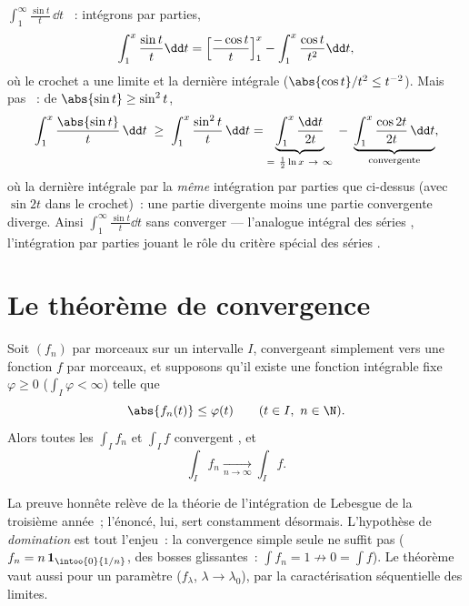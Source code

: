 \begin{example}\label{ex:b2:integration:sint}
$\displaystyle\int_1^{\infty} \frac{\sin t}{t}\,\dd t$ ~:
intégrons par parties,
\[
\int_1^x \frac{\sin t}{t}\dd t
= \Bigl[\frac{-\cos t}{t}\Bigr]_1^x - \int_1^x \frac{\cos
t}{t^2}\dd t ,
\]
où le crochet a une limite et la dernière intégrale 
 ($\abs{\cos t}/t^2 \leq t^{-2}$). Mais pas ~:
de $\abs{\sin t} \geq \sin^2 t$,
\[
\int_1^x \frac{\abs{\sin t}}{t}\,\dd t
\;\geq\; \int_1^x \frac{\sin^2t}{t}\,\dd t
= \underbrace{\int_1^x \frac{\dd t}{2t}}_{=\ \frac12\ln x
\ \to\ \infty}
\;-\; \underbrace{\int_1^x \frac{\cos 2t}{2t}\,\dd
t}_{\text{convergente}} ,
\]
où la dernière intégrale  par la \emph{même}
intégration par parties que ci-dessus (avec $\sin 2t$ dans le crochet)~:
une partie divergente moins une partie convergente diverge. Ainsi
$\int_1^\infty\frac{\sin t}{t}\dd t$  sans converger
 --- l'analogue intégral des séries ,
l'intégration par parties jouant le rôle du critère spécial des
séries .
\end{example}

\section{Le théorème de convergence}

\begin{theorem}\label{thm:b2:integration:dominated}
Soit $(f_n)$  par morceaux sur un intervalle $I$, convergeant
simplement vers une fonction $f$  par morceaux, et supposons
qu'il existe une fonction intégrable fixe $\varphi \geq 0$ ($\int_I \varphi < \infty$)
telle que
\[
\abs{f_n(t)} \leq \varphi(t) \qquad (t \in I,\ n \in \N).
\]
Alors toutes les $\int_I f_n$ et $\int_I f$ convergent , et
\[
\int_I f_n \xrightarrow[n \to \infty]{} \int_I f .
\]
\end{theorem}
\admitted

\begin{remark}
La preuve honnête relève de la théorie de l'intégration de Lebesgue de
la troisième année~; l'énoncé, lui, sert constamment désormais.
L'hypothèse de \emph{domination} est tout l'enjeu~: la convergence
simple seule ne suffit pas ($f_n = n\,\mathbf{1}_{\intoo{0}{1/n}}$,
des bosses glissantes~: $\int f_n = 1 \not\to 0 = \int f$). Le
théorème vaut aussi pour un paramètre  ($f_\lambda$, $\lambda \to
\lambda_0$), par la caractérisation séquentielle des limites.
\end{remark}

